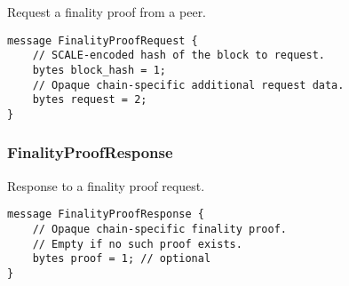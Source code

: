 \documentclass{book}
\begin{document}
Request a finality proof from a peer.

\begin{lstlisting}[frame=single]
message FinalityProofRequest {
    // SCALE-encoded hash of the block to request.
    bytes block_hash = 1;
    // Opaque chain-specific additional request data.
    bytes request = 2;
}
\end{lstlisting}

\subsubsection{FinalityProofResponse}

Response to a finality proof request.

\begin{lstlisting}[frame=single]
message FinalityProofResponse {
    // Opaque chain-specific finality proof.
    // Empty if no such proof exists.
    bytes proof = 1; // optional
}
\end{lstlisting}
\end{document}
